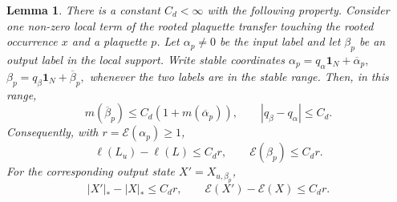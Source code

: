 \documentclass[11pt,a4paper,reqno]{amsart}
\newtheorem{lemma}[theorem]{Lemma}
\theoremstyle{definition}
\theoremstyle{remark}
\begin{document}
\begin{lemma}\label{lem:local-transfer-distortion}
There is a constant $C_d<\infty$ with the following property.  Consider one non-zero local term of the rooted plaquette transfer touching the rooted occurrence $x$ and a plaquette $p$.  Let $\alpha_p\ne0$ be the input label and let $\beta_p$ be an output label in the local support.  Write stable coordinates $\alpha_p=q_\alpha \mathbf 1_N+\overline\alpha_p,$ $\beta_p=q_\beta \mathbf 1_N+\overline\beta_p,$ whenever the two labels are in the stable range.  Then, in this range,
\begin{equation}\label{eq:local-transfer-stable-distortion}
m(\overline\beta_p)\le C_d(1+m(\overline\alpha_p)),
\qquad
|q_\beta-q_\alpha|\le C_d.
\end{equation}
Consequently, with $r=\mathcal E(\alpha_p)\ge1$,
\begin{equation}\label{eq:local-transfer-distortion}
\ell(L_u)-\ell(L)\le C_d r,
\qquad
\mathcal E(\beta_p)\le C_d r.
\end{equation}
For the corresponding output state $X'=X_{u,\beta_p}$,
\begin{equation}\label{eq:local-state-distortion}
|X'|_*-|X|_*\le C_d r,
\qquad
\mathcal E(X')-\mathcal E(X)\le C_d r.
\end{equation}
\end{lemma}
\end{document}
